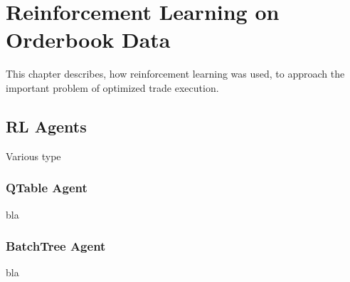 \chapter{Reinforcement Learning on Orderbook Data}
\label{chap:reinforcementlearning}
This chapter describes, how reinforcement learning was used, to approach the important problem of optimized trade execution.


\section{RL Agents}
Various type

\subsection{QTable Agent}
bla

\subsection{BatchTree Agent}
bla


\cleardoublepage{}